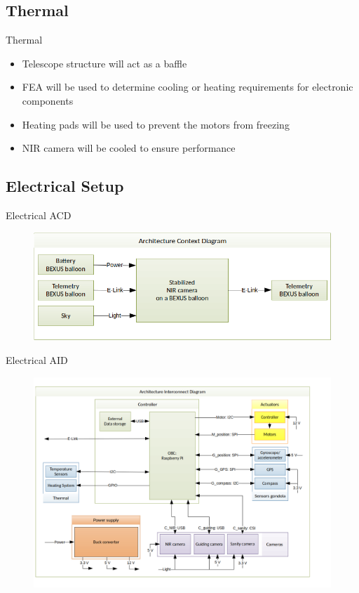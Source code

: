 \documentclass[11pt, aspectratio=169]{beamer}
\begin{document}
\subsection{Thermal} 			%
\begin{frame}{Thermal}
\begin{itemize}
	\item Telescope structure will act as a baffle
	\item FEA will be used to determine cooling or heating requirements for electronic components
	\item Heating pads will be used to prevent the motors from freezing
	\item NIR camera will be cooled to ensure performance
\end{itemize}

\end{frame}

\subsection{Electrical Setup}	%
\begin{frame}[c]{Electrical ACD}
\centering
\begin{figure}
	\includegraphics[width=.8\textwidth]{figures/images/elec_ACD.png}
\end{figure}
\end{frame}

\begin{frame}{Electrical AID}
\begin{figure}
	\includegraphics[width=.65\textwidth]{figures/images/elec_AID.png}
\end{figure}
\end{frame}
\end{document}
